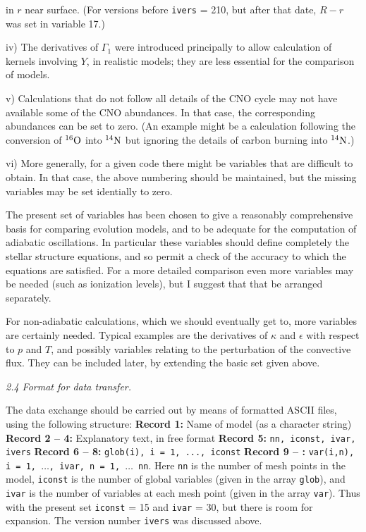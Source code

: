 in $r$ near surface. (For versions before {\tt ivers} = 210,
but after that date, $R - r$ was set in variable 17.)
\item{iv)}
The derivatives of $\Gamma_1$ were introduced principally to allow
calculation of kernels involving $Y$, in realistic models;
they are less essential for the comparison of models.
\item{v)}
Calculations that do not follow all details of the CNO cycle
may not have available some of the CNO abundances.
In that case, the corresponding abundances can be set to zero.
(An example might be a calculation following the conversion of
${}^{16}{\rm O}$ into ${}^{14}{\rm N}$ but ignoring the
details of carbon burning into ${}^{14}{\rm N}$.)
\item{vi)}
More generally, for a given code there might be variables that are
difficult to obtain. 
In that case, the above numbering should be maintained, but the
missing variables may be set identially to zero.

\medskip\noindent
The present set of variables has been chosen to give a reasonably
comprehensive basis for comparing evolution models, and to be
adequate for the computation of adiabatic oscillations.
In particular these variables should define completely
the stellar structure equations, and so permit a check of the
accuracy to which the equations are satisfied.
For a more detailed comparison even more variables may be needed
(such as ionization levels), but I suggest that that be arranged
separately. 

For non-adiabatic calculations, which we should eventually
get to, more variables are certainly needed.
Typical examples are the derivatives of $\kappa$ and $\epsilon$
with respect to $p$ and $T$, and possibly variables relating
to the perturbation of the convective flux.
They can be included later, by extending the basic set
given above.

\subsect
{\it 2.4 Format for data transfer.}

The data exchange should be carried out by means of formatted
ASCII files, using the following structure:
\medskip
{\obeylines
{\bf Record 1:} %
Name of model (as a character string)
{\bf Record 2 -- 4:} %
Explanatory text, in free format
{\bf Record 5:} %
{\tt nn, iconst, ivar, ivers}
{\bf Record 6 -- 8:} %
{\tt glob(i), i = 1, ..., iconst}
{\bf Record 9 --  :} %
{\tt var(i,n), i = 1, $\ldots$, ivar, n = 1, $\ldots$ nn}.
}
\medskip\noindent
Here {\tt nn} is the number of mesh points in the model,
{\tt iconst} is the number of global variables (given in the array
{\tt glob}), and {\tt ivar} is the number of variables at each mesh point
(given in the array {\tt var}).
Thus with the present set {\tt iconst} = 15 and {\tt ivar} = 30, but there is
room for expansion.
The version number {\tt ivers} was discussed above.

